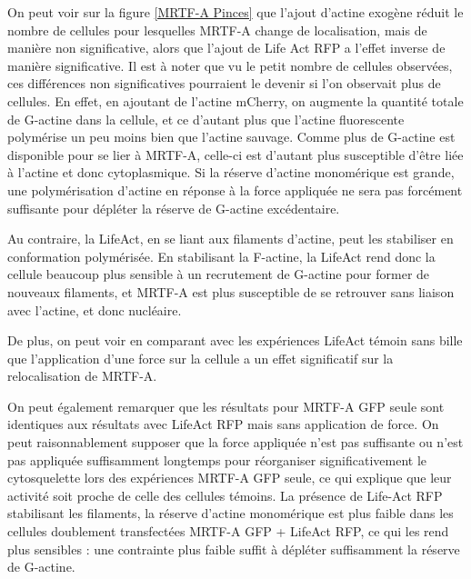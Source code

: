\documentclass{report}
\begin{document}
On peut voir sur la figure \ref{MRTF-A Pinces} que l'ajout d'actine exogène réduit le nombre de cellules pour lesquelles MRTF-A change de localisation, mais de manière non significative, alors que l'ajout de Life Act RFP a l'effet inverse de manière significative. Il est à noter que vu le petit nombre de cellules observées, ces différences non significatives pourraient le devenir si l'on observait plus de cellules. 
En effet, en ajoutant de l'actine mCherry, on augmente la quantité totale de G-actine dans la cellule, et ce d'autant plus que l'actine fluorescente polymérise un peu moins bien que l'actine sauvage. Comme plus de G-actine est disponible pour se lier à MRTF-A, celle-ci est d'autant plus susceptible d'être liée à l'actine et donc cytoplasmique. 
Si la réserve d'actine monomérique est grande, une polymérisation d'actine en réponse à la force appliquée ne sera pas forcément suffisante pour dépléter la réserve de G-actine excédentaire.

Au contraire, la LifeAct, en se liant aux filaments d'actine, peut les stabiliser en conformation polymérisée. En stabilisant la F-actine, la LifeAct rend donc la cellule beaucoup plus sensible à un recrutement de G-actine pour former de nouveaux filaments, et MRTF-A est plus susceptible de se retrouver sans liaison avec l'actine, et donc nucléaire.

De plus, on peut voir en comparant avec les expériences LifeAct témoin sans bille que l'application d'une force sur la cellule a un effet significatif sur la relocalisation de MRTF-A. 

On peut également remarquer que les résultats pour MRTF-A GFP seule sont identiques aux résultats avec LifeAct RFP mais sans application de force. 
On peut raisonnablement supposer que la force appliquée n'est pas suffisante ou n'est pas appliquée suffisamment longtemps pour réorganiser significativement le cytosquelette lors des expériences MRTF-A GFP seule, ce qui explique que leur activité soit proche de celle des cellules témoins. 
La présence de Life-Act RFP stabilisant les filaments, la réserve d'actine monomérique est plus faible dans les cellules doublement transfectées MRTF-A GFP + LifeAct RFP, ce qui les rend plus sensibles : une contrainte plus faible suffit à dépléter suffisamment la réserve de G-actine. 
\end{document}
